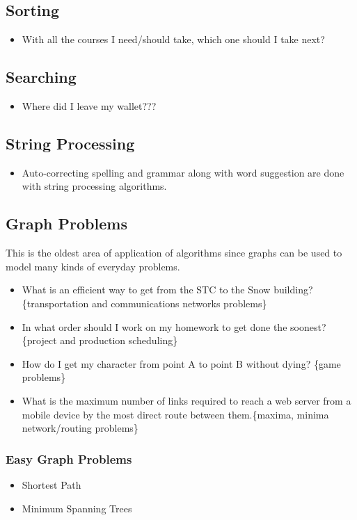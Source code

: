 \documentclass[12pt]{amsart}
\begin{document}
\subsection{Sorting}
\begin{itemize}
	\item With all the courses I need/should take, which one should I take next?
\end{itemize}
\subsection{Searching}
\begin{itemize}
	\item Where did I leave my wallet???
\end{itemize}
\subsection{String Processing}
\begin{itemize}
	\item Auto-correcting spelling and grammar along with word suggestion are done with string processing algorithms.
\end{itemize}
\subsection{Graph Problems} This is the oldest area of application of algorithms since graphs can be used to model many kinds of everyday problems.
\begin{itemize}
	\item What is an efficient way to get from the STC to the Snow building? \{transportation and communications networks problems\}
	\item In what order should I work on my homework to get done the soonest? \{project and production scheduling\}
    	\item How do I get my character from point A to point B without dying? \{game problems\}
	\item What is the maximum number of links required to reach a web server from a mobile device by the most direct route between them.\{maxima, minima network/routing problems\}
\end{itemize}
\subsubsection{Easy Graph Problems}
\begin{itemize}
	\item Shortest Path
	\item Minimum Spanning Trees
\end{itemize}
\end{document}
